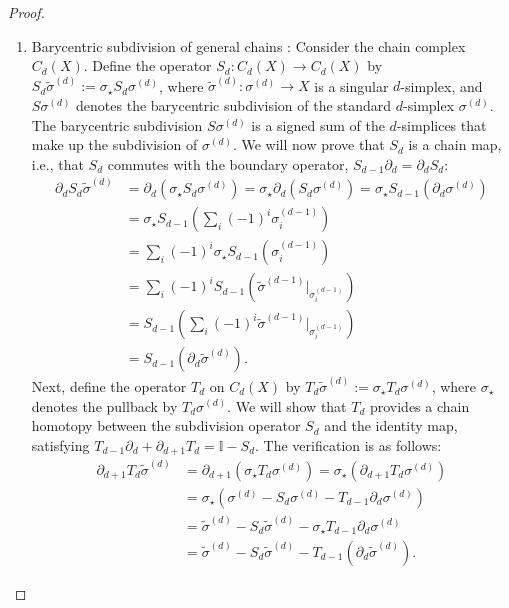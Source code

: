 \begin{proof}
\begin{enumerate}
	\item Barycentric subdivision of general chains \cite[Proposition 2.21 (3)]{hatcher2005algebraic}: Consider the chain complex \( C_d(X) \). Define the operator \( S_d: C_d(X) \to C_d(X) \) by \( S_d\tilde{\sigma}^{(d)} := \sigma_\star S_d\sigma^{(d)} \), where \( \tilde{\sigma}^{(d)}: \sigma^{(d)} \to X \) is a singular \( d \)-simplex, and \( S\sigma^{(d)} \) denotes the barycentric subdivision of the standard \( d \)-simplex \( \sigma^{(d)} \). The barycentric subdivision \( S\sigma^{(d)} \) is a signed sum of the \( d \)-simplices that make up the subdivision of \( \sigma^{(d)} \). We will now prove that \( S_d \) is a chain map, i.e., that \( S_d \) commutes with the boundary operator, \( S_{d-1}\partial_{d} = \partial_d S_d \):
	\begin{align}
		\partial_d S_d\tilde{\sigma}^{(d)} & = \partial_d (\sigma_\star S_d\sigma^{(d)}) = \sigma_\star \partial_d (S_d\sigma^{(d)}) = \sigma_\star S_{d-1}(\partial_d \sigma^{(d)}) \nonumber\\
		                 & = \sigma_\star S_{d-1}\left(\sum_i (-1)^i \sigma^{(d-1)}_i\right) \nonumber\\
		                 & = \sum_i (-1)^i \sigma_\star S_{d-1}(\sigma^{(d-1)}_i) \nonumber\\ 
		                 & = \sum_i (-1)^i S_{d-1}\left(\tilde{\sigma}^{(d-1)} \vert_{\sigma^{(d-1)}_i}\right) \nonumber\\
		                 & = S_{d-1}\left(\sum_i (-1)^i \tilde{\sigma}^{(d-1)} \vert_{\sigma^{(d-1)}_i}\right) \nonumber\\
		                 & = S_{d-1}(\partial_{d} \tilde{\sigma}^{(d)}). 
	\end{align}
	Next, define the operator \( T_d \) on \( C_d(X) \) by \( T_d\tilde{\sigma}^{(d)} := \sigma_\star T_d\sigma^{(d)} \), where \( \sigma_\star \) denotes the pullback by \( T_d\sigma^{(d)} \). We will show that \( T_d \) provides a chain homotopy between the subdivision operator \( S_d \) and the identity map, satisfying \( T_{d-1}\partial_{d} + \partial_{d+1} T_{d} = \mathbb{I} - S_{d} \). The verification is as follows:
	\begin{align}
		\partial_{d+1} T_d\tilde{\sigma}^{(d)} & = \partial_{d+1} (\sigma_\star T_d\sigma^{(d)}) = \sigma_\star (\partial_{d+1} T_d\sigma^{(d)}) \nonumber\\
		                 & = \sigma_\star (\sigma^{(d)} - S_{d}\sigma^{(d)} - T_{d-1}\partial_{d} \sigma^{(d)}) \nonumber\\
		                 & = \tilde{\sigma}^{(d)} - S_{d}\tilde{\sigma}^{(d)} - \sigma_\star T_{d-1}\partial_{d} \sigma^{(d)} \nonumber\\
		                 & = \tilde{\sigma}^{(d)} - S_{d}\tilde{\sigma}^{(d)} - T_{d-1}(\partial_d \tilde{\sigma}^{(d)}).                                        
	\end{align}
		

\end{enumerate}
\end{proof}
